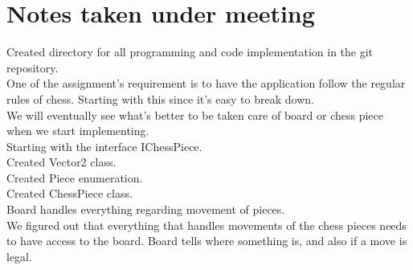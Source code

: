\documentclass[letterpaper,11pt]{article}
\begin{document}
\section*{Notes taken under meeting}
Created directory for all programming and code implementation in the git repository.\\
One of the assignment's requirement is to have the application follow the regular rules of chess. Starting with this since it's easy to break down.\\
We will eventually see what's better to be taken care of board or chess piece when we start implementing.\\
Starting with the interface IChessPiece.\\
Created Vector2 class.\\
Created Piece enumeration.\\
Created ChessPiece class.\\
Board handles everything regarding movement of pieces.\\
We figured out that everything that handles movements of the chess pieces needs to have access to the board. Board tells where something is, and also if a move is legal.
\end{document}
